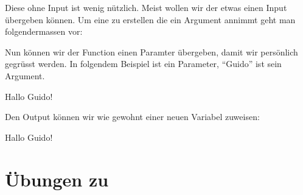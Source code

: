 \documentclass[letterpaper,10pt,english]{sphinxmanual}
\begin{document}
Diese  ohne Input ist wenig nützlich. Meist wollen wir der  etwas \sphinxhyphen{} einen Input \sphinxhyphen{} übergeben können. Um eine  zu erstellen die ein Argument annimmt geht man folgendermassen vor:

\begin{sphinxVerbatim}[commandchars=\\\{\}]
 
\end{sphinxVerbatim}

Nun können wir der Function einen Paramter übergeben, damit wir persönlich gegrüsst werden. In folgendem Beispiel ist  ein Parameter, “Guido” ist sein Argument.

\begin{sphinxVerbatim}[commandchars=\\\{\}]
\end{sphinxVerbatim}

\begin{sphinxVerbatim}[commandchars=\\\{\}]
\PYGZsq{}Hallo Guido!\PYGZsq{}
\end{sphinxVerbatim}

Den Output können wir wie gewohnt einer neuen Variabel zuweisen:

\begin{sphinxVerbatim}[commandchars=\\\{\}]
  
\end{sphinxVerbatim}

\begin{sphinxVerbatim}[commandchars=\\\{\}]
\PYGZsq{}Hallo Guido!\PYGZsq{}
\end{sphinxVerbatim}


\chapter{Übungen zu }
\label{\detokenize{02_03_Functions:ubungen-zu-functions}}\label{\detokenize{02_03_Functions::doc}}
\end{document}
